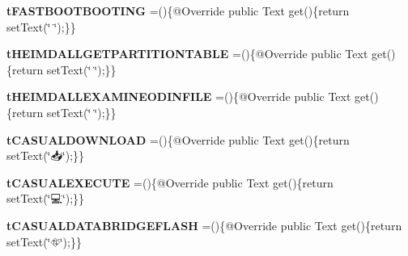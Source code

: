 \begin{DoxyCompactItemize}
\item 
\hypertarget{enumcom_1_1casual__dev_1_1zodui_1_1contentpanel_1_1_mode_content_1_1emote_ac2edc73e2b2cdc6cd91a90cafb18fb91}{{\bfseries t\-F\-A\-S\-T\-B\-O\-O\-T\-B\-O\-O\-T\-I\-N\-G} =()\{@Override public Text get()\{return set\-Text(\char`\"{}🔐\char`\"{});\}\}}\label{enumcom_1_1casual__dev_1_1zodui_1_1contentpanel_1_1_mode_content_1_1emote_ac2edc73e2b2cdc6cd91a90cafb18fb91}

\item 
\hypertarget{enumcom_1_1casual__dev_1_1zodui_1_1contentpanel_1_1_mode_content_1_1emote_a8a9a31c30d7df3c4ebb0725edd43d254}{{\bfseries t\-H\-E\-I\-M\-D\-A\-L\-L\-G\-E\-T\-P\-A\-R\-T\-I\-T\-I\-O\-N\-T\-A\-B\-L\-E} =()\{@Override public Text get()\{return set\-Text(\char`\"{}💾\char`\"{});\}\}}\label{enumcom_1_1casual__dev_1_1zodui_1_1contentpanel_1_1_mode_content_1_1emote_a8a9a31c30d7df3c4ebb0725edd43d254}

\item 
\hypertarget{enumcom_1_1casual__dev_1_1zodui_1_1contentpanel_1_1_mode_content_1_1emote_a66773be761f550ff6dad1abaa3c99eee}{{\bfseries t\-H\-E\-I\-M\-D\-A\-L\-L\-E\-X\-A\-M\-I\-N\-E\-O\-D\-I\-N\-F\-I\-L\-E} =()\{@Override public Text get()\{return set\-Text(\char`\"{}📂\char`\"{});\}\}}\label{enumcom_1_1casual__dev_1_1zodui_1_1contentpanel_1_1_mode_content_1_1emote_a66773be761f550ff6dad1abaa3c99eee}

\item 
\hypertarget{enumcom_1_1casual__dev_1_1zodui_1_1contentpanel_1_1_mode_content_1_1emote_a275364a67596a9789b0de0e914b9b240}{{\bfseries t\-C\-A\-S\-U\-A\-L\-D\-O\-W\-N\-L\-O\-A\-D} =()\{@Override public Text get()\{return set\-Text(\char`\"{}📥\char`\"{});\}\}}\label{enumcom_1_1casual__dev_1_1zodui_1_1contentpanel_1_1_mode_content_1_1emote_a275364a67596a9789b0de0e914b9b240}

\item 
\hypertarget{enumcom_1_1casual__dev_1_1zodui_1_1contentpanel_1_1_mode_content_1_1emote_abbc0898a8c7bc7184d98ef64fdf2e19b}{{\bfseries t\-C\-A\-S\-U\-A\-L\-E\-X\-E\-C\-U\-T\-E} =()\{@Override public Text get()\{return set\-Text(\char`\"{}💻\char`\"{});\}\}}\label{enumcom_1_1casual__dev_1_1zodui_1_1contentpanel_1_1_mode_content_1_1emote_abbc0898a8c7bc7184d98ef64fdf2e19b}

\item 
\hypertarget{enumcom_1_1casual__dev_1_1zodui_1_1contentpanel_1_1_mode_content_1_1emote_a9d1a201073eaa7b73af8430cde05e0fc}{{\bfseries t\-C\-A\-S\-U\-A\-L\-D\-A\-T\-A\-B\-R\-I\-D\-G\-E\-F\-L\-A\-S\-H} =()\{@Override public Text get()\{return set\-Text(\char`\"{}⛗\char`\"{});\}\}}\label{enumcom_1_1casual__dev_1_1zodui_1_1contentpanel_1_1_mode_content_1_1emote_a9d1a201073eaa7b73af8430cde05e0fc}


\end{DoxyCompactItemize}
